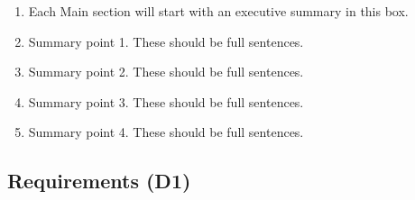 







\begin{summary}
\begin{enumerate}
\item Each Main section will start with an executive summary in this box.
\item Summary point 1. These should be full sentences.
\item Summary point 2. These should be full sentences.
\item Summary point 3. These should be full sentences.
\item Summary point 4. These should be full sentences.
\end{enumerate}
\end{summary}


 \subsection{Requirements (D1)}

